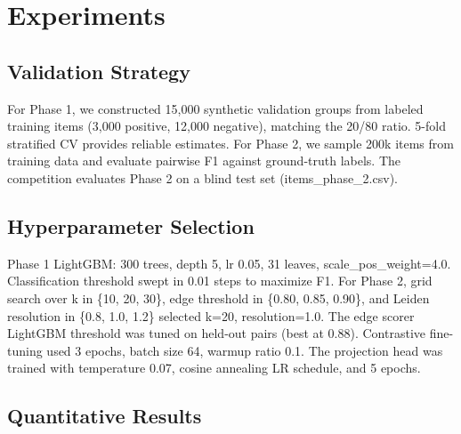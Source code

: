 \documentclass[10pt,twocolumn,a4paper]{article}
\begin{document}
\section{Experiments}

\subsection{Validation Strategy}
For Phase 1, we constructed 15,000 synthetic validation groups from labeled training items (3,000 positive, 12,000 negative), 
matching the 20/80 ratio. 5-fold stratified CV provides reliable estimates. For Phase 2, we sample 200k items from 
training data and evaluate pairwise F1 against ground-truth labels. The competition evaluates Phase 2 on a blind test set (items\_phase\_2.csv).

\subsection{Hyperparameter Selection}
Phase 1 LightGBM: 300 trees, depth 5, lr 0.05, 31 leaves, scale\_pos\_weight=4.0. Classification threshold swept in 0.01 
steps to maximize F1. For Phase 2, grid search over k in \{10, 20, 30\}, edge threshold in \{0.80, 0.85, 0.90\}, and Leiden 
resolution in \{0.8, 1.0, 1.2\} selected k=20, resolution=1.0. The edge scorer LightGBM threshold was tuned on held-out 
pairs (best at 0.88). Contrastive fine-tuning used 3 epochs, batch size 64, warmup ratio 0.1. The projection head was 
trained with temperature 0.07, cosine annealing LR schedule, and 5 epochs.

\subsection{Quantitative Results}
\end{document}
